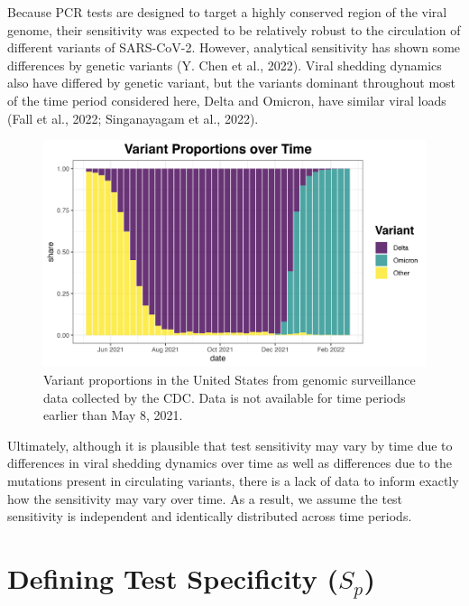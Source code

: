 \documentclass[12pt,twoside]{smiththesis}
\begin{document}
Because PCR tests are designed to target a highly conserved region of the viral genome, their sensitivity was expected to be relatively robust to the circulation of different variants of SARS-CoV-2. However, analytical sensitivity has shown some differences by genetic variants (Y. Chen et al., 2022). Viral shedding dynamics also have differed by genetic variant, but the variants dominant throughout most of the time period considered here, Delta and Omicron, have similar viral loads (Fall et al., 2022; Singanayagam et al., 2022).
\begin{figure}

{\centering \includegraphics[width=0.8\linewidth]{./figure/variant_plot} 

}

\caption{Variant proportions in the United States from genomic surveillance data collected by the CDC. Data is not available for time periods earlier than May 8, 2021.}\label{fig:unnamed-chunk-63}
\end{figure}
Ultimately, although it is plausible that test sensitivity may vary by time due to differences in viral shedding dynamics over time as well as differences due to the mutations present in circulating variants, there is a lack of data to inform exactly how the sensitivity may vary over time. As a result, we assume the test sensitivity is independent and identically distributed across time periods.

\hypertarget{defining-test-specificity-s_p}{%
\section{\texorpdfstring{Defining Test Specificity (\(S_p\))}{Defining Test Specificity (S\_p)}}\label{defining-test-specificity-s_p}}
\end{document}
